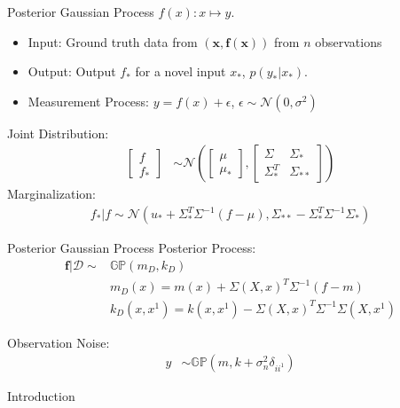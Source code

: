 \begin{frame}{Posterior Gaussian Process}
$f(x): x \mapsto y$. 
\begin{itemize}
    \item Input: Ground truth data  from $(\mathbf{x},\mathbf{f(x)})$ from $n$ observations
\item Output: Output $f_*$ for a novel input $x_*$, $p(y_*|x_*)$. 
\item Measurement Process: $y = f(x)+\epsilon $, $\epsilon \sim \mathcal{N}(0,\sigma^2)$
\end{itemize}
Joint Distribution:
\begin{align}
    \begin{bmatrix}
        f \\
        f_*
    \end{bmatrix}& \sim
    \mathcal{N}\left(
    \begin{bmatrix}
        \mu\\
        \mu_*
    \end{bmatrix}, 
    \begin{bmatrix}
        \Sigma & \Sigma_* \\
        \Sigma_*^T & \Sigma_{**}
    \end{bmatrix}
    \right)
\end{align}
Marginalization:
\begin{align}
    f_*|f \sim
    \mathcal{N}(u_*+\Sigma_*^T\Sigma^{-1}(f-\mu),\Sigma_{**}-\Sigma_*^T\Sigma^{-1}\Sigma_*)
\end{align}

\end{frame}

\begin{frame}{Posterior Gaussian Process}
 Posterior Process:
\begin{align}
    \mathbf{f}|\mathcal{D} \sim & \mathbb{GP}(m_D,k_D) \nonumber\\
    & m_D(x) = m(x) + \Sigma(X,x)^T\Sigma^{-1}(f-m) \nonumber\\
    & k_D(x,x^1) = k(x,x^1) - \Sigma(X,x)^T\Sigma^{-1}\Sigma(X,x^1)
\end{align}

Observation Noise:
\begin{align}
    y & \sim \mathbb{GP} (m,k+\sigma_n^2\delta_{ii^1})
\end{align}
\end{frame}

\begin{frame}{Introduction}

\end{frame}

